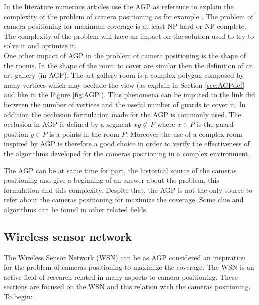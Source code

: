 In the literature numerous articles use the AGP as reference to explain the complexity of the problem of camera positioning as for example \cite{26*moeini,44*chvatal1975,149*mavrinac2013,151*zhao2013}. The problem of camera positioning for maximum coverage is at least NP-hard or NP-complete. 
The complexity of the problem will have an impact on the solution used  to try to solve it and optimize it.\\
One other impact of AGP in the problem of camera positioning is the shape of the rooms. In \cite{170*yabuta2008,171*horster2006,33*reddy2012,43*erdem2006} the shape of the room to cover are similar then the definition of an art gallery (in AGP). The art gallery room is a complex polygon composed by many vertices which may occlude the view (as explain in Section \ref{sec:AGPdef} and like in the Figure \ref{fig:AGP}). This phenomena can be imputed to the link did between the number of vertices and the useful number of guards to cover it. 
In addition the occlusion formulation made for the AGP is commonly used.
The occlusion in AGP is defined  by  a segment $xy \not\subset P$   where $x \in P$ is the guard position $y \in P$ is a points in the room $P$. 
Moreover the use of a complex room inspired by AGP is therefore a good choice in order to verify the effectiveness of the algorithms developed for the cameras positioning in a complex environment.


The AGP can be at same time for part, the  historical source of the cameras positioning and give a beginning of an answer about the problem, this formulation and this complexity. Despite that, the AGP is not the only source to refer about the cameras positioning for maximize the coverage. Some clue and algorithms can be found in other related fields. 


\subsection{Wireless sensor network }

The Wireless Sensor Network (WSN) can be as AGP considered an inspiration for the problem of cameras positioning to maximize the coverage. The WSN is an active field of research related in many aspects to camera positioning. These sections are focused on the WSN and this relation with the cameras positioning.\\  To begin:

